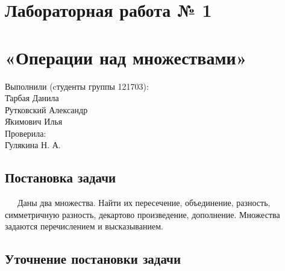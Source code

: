 \documentclass[a4paper,12pt]{extarticle}
\begin{document}

\hspace{0pt}
\vfill
\begin{center}
\section*{Лабораторная работа № 1}
\section*{«Операции над множествами»}
\end{center}
\vfill
\begin{tabbing}
Выполнили (cтуденты группы 121703):\\
\hspace{1em} \= Тарбая Данила\\
\hspace{1em} \= Рутковский Александр\\
\hspace{1em} \= Якимович Илья\\
Проверила:\\
\hspace{1em} \= Гулякина Н. А.\\
\end{tabbing}
\hspace{0pt}
\pagebreak


\newpage
\fancyhf{}
\begin{center}
\section*{Постановка задачи}
\end{center}
\justify\ \ \ Даны два множества. Найти их пересечение, объединение, разность, симметричную разность, декартово произведение, дополнение. Множества задаются перечислением и высказыванием.
\begin{center}
\section*{Уточнение постановки задачи}
\end{center}
\end{document}
